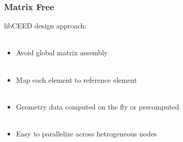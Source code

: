 \documentclass{beamer}
\begin{document}

\begin{frame}
\begin{center}
\frametitle{Matrix Free}

libCEED design approach:\\

~\\

\begin{itemize}

\item Avoid global matrix assembly\\

~\\

\item Map each element to reference element\\

~\\

\item Geometry data computed on the fly or precomputed\\

~\\

\item Easy to parallelize across hetrogeneous nodes

\end{itemize}

\end{center}
\end{frame}

\end{document}
